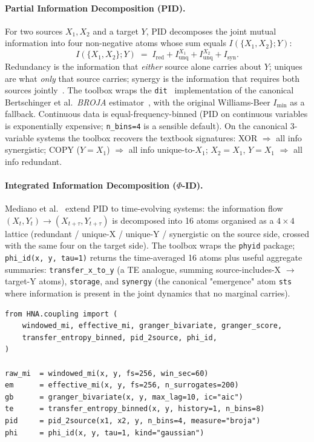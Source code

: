 \documentclass[11pt,a4paper]{article}
\begin{document}
\paragraph{Partial Information Decomposition (PID).}
For two sources $X_1, X_2$ and a target $Y$, PID decomposes the joint
mutual information into four non-negative atoms whose sum equals
$I(\{X_1, X_2\}; Y)$:
\begin{equation}
I(\{X_1, X_2\}; Y) \;=\;
   I_{\mathrm{red}}
 + I_{\mathrm{unq}}^{X_1}
 + I_{\mathrm{unq}}^{X_2}
 + I_{\mathrm{syn}}.
\end{equation}
Redundancy is the information that \emph{either} source alone carries
about $Y$; uniques are what \emph{only} that source carries; synergy is
the information that requires both sources jointly~\cite{WilliamsBeer2010}.
The toolbox wraps the \texttt{dit}~\cite{ditpkg} implementation of the
canonical Bertschinger et al.\ \emph{BROJA}
estimator~\cite{Bertschinger2014}, with the original Williams-Beer
$I_{\min}$ as a fallback. Continuous data is equal-frequency-binned (PID
on continuous variables is exponentially expensive; \texttt{n\_bins=4}
is a sensible default). On the canonical 3-variable systems the toolbox
recovers the textbook signatures: XOR $\Rightarrow$ all info synergistic;
COPY ($Y\!=\!X_1$) $\Rightarrow$ all info unique-to-$X_1$;
$X_2\!=\!X_1$, $Y\!=\!X_1$ $\Rightarrow$ all info redundant.

\paragraph{Integrated Information Decomposition ($\Phi$-ID).}
Mediano et al.~\cite{Mediano2021} extend PID to time-evolving systems:
the information flow $(X_t, Y_t) \to (X_{t+\tau}, Y_{t+\tau})$ is
decomposed into 16 atoms organised as a $4\!\times\!4$ lattice
(redundant / unique-X / unique-Y / synergistic on the source side,
crossed with the same four on the target side). The toolbox wraps
the \texttt{phyid} package; \texttt{phi\_id(x, y, tau=1)} returns the
time-averaged 16 atoms plus useful aggregate summaries:
\texttt{transfer\_x\_to\_y} (a TE analogue, summing source-includes-X
$\to$ target-Y atoms), \texttt{storage}, and \texttt{synergy} (the
canonical "emergence" atom \texttt{sts} where information is present
in the joint dynamics that no marginal carries).

\begin{lstlisting}
from HNA.coupling import (
    windowed_mi, effective_mi, granger_bivariate, granger_score,
    transfer_entropy_binned, pid_2source, phi_id,
)

raw_mi  = windowed_mi(x, y, fs=256, win_sec=60)
em      = effective_mi(x, y, fs=256, n_surrogates=200)
gb      = granger_bivariate(x, y, max_lag=10, ic="aic")
te      = transfer_entropy_binned(x, y, history=1, n_bins=8)
pid     = pid_2source(x1, x2, y, n_bins=4, measure="broja")
phi     = phi_id(x, y, tau=1, kind="gaussian")
\end{lstlisting}
\end{document}
